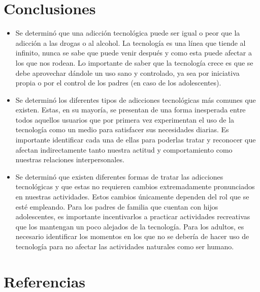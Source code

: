 \documentclass[12pt,spanish,Letterpaper,openany]{book}
\begin{document}

\hypertarget{conclusiones-8}{%
\section*{Conclusiones}\label{conclusiones-8}}

\begin{itemize}
\item
  Se determinó que una adicción tecnológica puede ser igual o peor que la adicción a las drogas o al alcohol. La tecnología es una línea que tiende al infinito, nunca se sabe que puede venir después y como esta puede afectar a los que nos rodean. Lo importante de saber que la tecnología crece es que se debe aprovechar dándole un uso sano y controlado, ya sea por iniciativa propia o por el control de los padres (en caso de los adolescentes).
\item
  Se determinó los diferentes tipos de adicciones tecnológicas más comunes que existen. Estas, en su mayoría, se presentan de una forma inesperada entre todos aquellos usuarios que por primera vez experimentan el uso de la tecnología como un medio para satisfacer sus necesidades diarias. Es importante identificar cada una de ellas para poderlas tratar y reconocer que afectan indirectamente tanto nuestra actitud y comportamiento como nuestras relaciones interpersonales.
\item
  Se determinó que existen diferentes formas de tratar las adicciones tecnológicas y que estas no requieren cambios extremadamente pronunciados en nuestras actividades. Estos cambios únicamente dependen del rol que se esté empleando. Para los padres de familia que cuentan con hijos adolescentes, es importante incentivarlos a practicar actividades recreativas que los mantengan un poco alejados de la tecnología. Para los adultos, es necesario identificar los momentos en los que no se debería de hacer uso de tecnología para no afectar las actividades naturales como ser humano.
\end{itemize}

\hypertarget{referencias-8}{%
\section*{Referencias}\label{referencias-8}}
\end{document}
